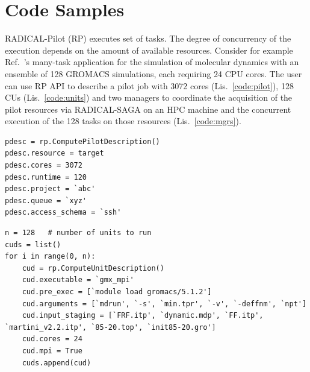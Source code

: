 \documentclass[preprint,12pt, a4paper]{elsarticle}
\begin{document}
\section*{Code Samples}\label{sec:metadata}

RADICAL-Pilot (RP) executes set of tasks. The degree of concurrency of the
execution depends on the amount of available resources. Consider for example
Ref.~\cite{balasubramanian2016extasy}'s many-task application for the
simulation of molecular dynamics with an ensemble of 128 GROMACS simulations,
each requiring 24 CPU cores. The user can use RP API to describe a pilot job
with 3072 cores (Lis.~\ref{code:pilot}), 128 CUs (Lis.~\ref{code:units}) and
two managers to coordinate the acquisition of the pilot resources via
RADICAL-SAGA on an HPC machine and the concurrent execution of the 128 tasks
on those resources (Lis.~\ref{code:mgrs}).

\begin{lstlisting}
pdesc = rp.ComputePilotDescription()        
pdesc.resource = target
pdesc.cores = 3072
pdesc.runtime = 120
pdesc.project = `abc'
pdesc.queue = `xyz'
pdesc.access_schema = `ssh'
\end{lstlisting}

\begin{lstlisting}
n = 128   # number of units to run
cuds = list()
for i in range(0, n):
    cud = rp.ComputeUnitDescription()
    cud.executable = `gmx_mpi'
    cud.pre_exec = [`module load gromacs/5.1.2']
    cud.arguments = [`mdrun', `-s', `min.tpr', `-v', `-deffnm', `npt']
    cud.input_staging = [`FRF.itp', `dynamic.mdp', `FF.itp', `martini_v2.2.itp', `85-20.top', `init85-20.gro'] 
    cud.cores = 24
    cud.mpi = True    
    cuds.append(cud)
\end{lstlisting}
\end{document}
